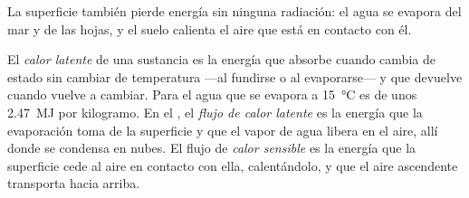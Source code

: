 La superficie también pierde energía sin ninguna radiación: el agua se
evapora del mar y de las hojas, y el suelo calienta el aire que está en
contacto con él.

\begin{definition}\label{def:g10:earth-energy-budget:latent-heat}
El \emph{calor latente} de una sustancia es la energía
que absorbe cuando cambia de estado sin cambiar de temperatura ---al
fundirse o al evaporarse--- y que devuelve cuando vuelve a cambiar. Para el
agua que se evapora a \qty{15}{\degreeCelsius} es de unos \qty{2.47}{MJ}
por kilogramo. En el , el \emph{flujo de calor latente} es
la energía que la evaporación toma de la superficie y que el vapor de agua
libera en el aire, allí donde se condensa en nubes. El flujo de \emph{calor
sensible} es la energía que la superficie cede al aire
en contacto con ella, calentándolo, y que el aire ascendente transporta hacia
arriba.
\end{definition}

